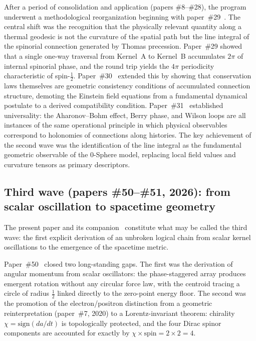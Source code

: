 \documentclass[%
 reprint, amsmath,amssymb, aps, prb, ]{revtex4-2}
\numberwithin{equation}{section}
\begin{document}
After a period of consolidation and application (papers \#8--\#28), the program underwent a methodological reorganization beginning with paper~\#29~\cite{hanamura29}. The central shift was the recognition that the physically relevant quantity along a thermal geodesic is not the curvature of the spatial path but the line integral of the spinorial connection generated by Thomas precession. Paper~\#29 showed that a single one-way traversal from Kernel~A to Kernel~B accumulates $2\pi$ of internal spinorial phase, and the round trip yields the $4\pi$ periodicity characteristic of spin-$\tfrac{1}{2}$. Paper~\#30~\cite{hanamura30} extended this by showing that conservation laws themselves are geometric consistency conditions of accumulated connection structure, demoting the Einstein field equations from a fundamental dynamical postulate to a derived compatibility condition. Paper~\#31~\cite{hanamura31} established universality: the Aharonov--Bohm effect, Berry phase, and Wilson loops are all instances of the same operational principle in which physical observables correspond to holonomies of connections along histories. The key achievement of the second wave was the identification of the line integral as the fundamental geometric observable of the 0-Sphere model, replacing local field values and curvature tensors as primary descriptors.

\subsection*{Third wave (papers \#50--\#51, 2026): from scalar oscillation to spacetime geometry}

The present paper and its companion~\cite{hanamura50} constitute what may be called the third wave: the first explicit derivation of an unbroken logical chain from scalar kernel oscillations to the emergence of the spacetime metric.

Paper~\#50~\cite{hanamura50} closed two long-standing gaps. The first was the derivation of angular momentum from scalar oscillators: the phase-staggered array produces emergent rotation without any circular force law, with the centroid tracing a circle of radius $\tfrac{1}{2}$ linked directly to the zero-point energy floor. The second was the promotion of the electron/positron distinction from a geometric reinterpretation (paper~\#7, 2020) to a Lorentz-invariant theorem: chirality $\chi = \mathrm{sign}(da/dt)$ is topologically protected, and the four Dirac spinor components are accounted for exactly by $\chi \times \mathrm{spin} = 2 \times 2 = 4$.
\end{document}
